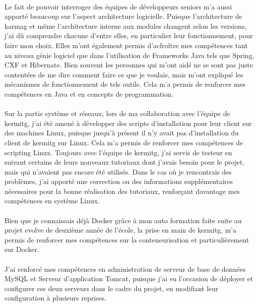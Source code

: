 \documentclass[12pt,a4paper]{report}
\begin{document}
\paragraph*{}Le fait de pouvoir interroger des équipes de développeurs seniors m’a
aussi apporté beaucoup sur l’aspect architecture logicielle. Puisque l’architecture de \gls{karmag} et même l’architecture interne aux modules changent selon les versions, j’ai dû comprendre chacune d’entre elles, en particulier leur fonctionnement, pour faire mon choix. Elles m'ont également permis d'acfroître mes compétences tant au niveau génie logiciel que dans l’utilisation de Frameworks Java tels que Spring, CXF et Hibernate. Bien souvent les personnes qui m’ont aidé ne se sont pas juste contentées de me dire comment faire ce que je voulais, mais m’ont expliqué les mécanismes de fonctionnement de tels outils. Cela m’a permis de renforcer mes compétences en Java et en concepts de programmation.
\paragraph*{}Sur la partie système et réseaux, lors de ma collaboration avec l’équipe de \gls{kermitg}, j’ai été amené à développer des scripts d’installation pour leur client sur des machines Linux, puisque jusqu’à présent il n’y avait pas d’installation du client de \gls{kermitg} sur Linux. Cela m’a permis de renforcer mes compétences de scripting Linux.
Toujours avec l’équipe de \gls{kermitg}, j’ai servis de testeur en suivant certains de leurs nouveaux tutoriaux dont j’avais besoin pour le projet, mais qui n’avaient pas encore été utilisés. Dans le cas où je rencontrais des problèmes, j’ai apporté une correction ou des informations supplémentaires nécessaires pour la bonne réalisation des tutoriaux, renforçant davantage mes compétences en système Linux.
\paragraph*{}Bien que je connaissais déjà Docker grâce à mon auto formation faite suite au projet \gls{evolve} de deuxième année de l’école, la prise en main de \gls{kermitg}, m’a permis de renforcer mes compétences sur la conteneurisation et particulièrement sur Docker.
\paragraph*{}J’ai renforcé mes compétences en administration de serveur de base de
données MySQL et Serveur d’application Tomcat, puisque j’ai eu l’occasion de déployer et configurer ces deux serveurs dans le cadre du projet, en modifiant leur configuration à plusieurs reprises.
\end{document}
